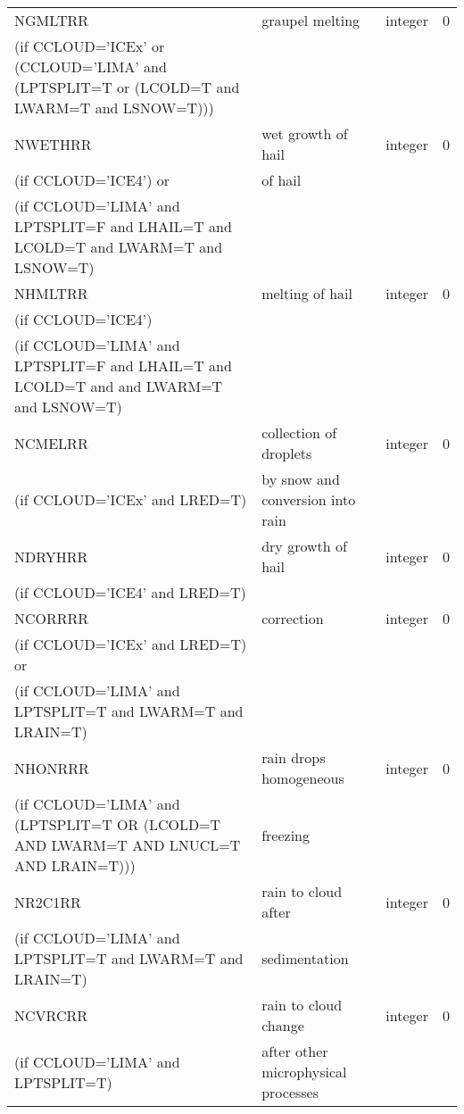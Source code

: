 \begin{longtable} {|p{}|p{}|>{\centering}p{}|p{}<{\centering}|}
NGMLTRR  & graupel melting& integer  &  0 \index{NGMLTRR!\innam{NAM\_BU\_RRR}}\\ \nopagebreak
(if CCLOUD='ICEx' or (CCLOUD='LIMA' and (LPTSPLIT=T or (LCOLD=T and LWARM=T and LSNOW=T))) & & & \\\hline
NWETHRR  & wet growth of hail & integer  &  0 \index{NWETHRR!\innam{NAM\_BU\_RRR}}\\ \nopagebreak
(if CCLOUD='ICE4') or &of hail &   &  \\
(if CCLOUD='LIMA' and LPTSPLIT=F and LHAIL=T and LCOLD=T and LWARM=T and LSNOW=T) & &   &  \\\hline
NHMLTRR  & melting of hail& integer  &  0 \index{NHMLTRR!\innam{NAM\_BU\_RRR}}\\ \nopagebreak
(if CCLOUD='ICE4')   &   &       &   \\ \nopagebreak
(if CCLOUD='LIMA' and LPTSPLIT=F and LHAIL=T and LCOLD=T and and LWARM=T and LSNOW=T)   &  &        &   \\\hline
NCMELRR  & collection of droplets & integer  &  0 \index{NCMELRR!\innam{NAM\_BU\_RRR}}\\ \nopagebreak
(if CCLOUD='ICEx' and LRED=T) & by snow and conversion into rain &   &  \\\hline
NDRYHRR  & dry growth of hail & integer  &  0 \index{NDRYHRR!\innam{NAM\_BU\_RRR}}\\ \nopagebreak
(if CCLOUD='ICE4' and LRED=T) & &   &  \\\hline
NCORRRR  & correction & integer  &  0 \index{NCORRRR!\innam{NAM\_BU\_RRR}}\\ \nopagebreak
(if CCLOUD='ICEx' and LRED=T) or & &   &  \\ \nopagebreak
(if CCLOUD='LIMA' and LPTSPLIT=T and LWARM=T and LRAIN=T) & &   &  \\\hline
NHONRRR  & rain drops homogeneous  & integer  &  0 \index{NHONRRR!\innam{NAM\_BU\_RRR}}\\ \nopagebreak
(if CCLOUD='LIMA' and (LPTSPLIT=T OR (LCOLD=T AND LWARM=T AND LNUCL=T AND LRAIN=T)))   & freezing  &       &   \\\hline
NR2C1RR & rain to cloud after  & integer  &  0 \index{NR2C1RR!\innam{NAM\_BU\_RRR}}\\ \nopagebreak
(if CCLOUD='LIMA' and LPTSPLIT=T and LWARM=T and LRAIN=T) & sedimentation&   &  \\\hline
NCVRCRR  & rain to cloud change & integer  &  0 \index{NCVRCRR!\innam{NAM\_BU\_RRR}}\\ \nopagebreak
(if CCLOUD='LIMA' and LPTSPLIT=T) &after other microphysical processes &   &  \\\hline

\end{longtable}

